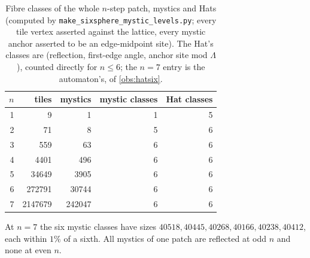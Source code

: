 \documentclass[11pt,a4paper]{article}
\newcommand{\Lam}{\Lambda}
\theoremstyle{plain}
\theoremstyle{definition}
\begin{document}
\begin{table}[htbp]
\centering
\begin{tabular}{rrrrr}
\toprule
$n$ & tiles & mystics & mystic classes & Hat classes\\
\midrule
1 & 9       & 1       & 1 & 5\\
2 & 71      & 8       & 5 & 6\\
3 & 559     & 63      & 6 & 6\\
4 & 4401    & 496     & 6 & 6\\
5 & 34649   & 3905    & 6 & 6\\
6 & 272791  & 30744   & 6 & 6\\
7 & 2147679 & 242047  & 6 & 6\\
\bottomrule
\end{tabular}
\caption{Fibre classes of the whole $n$-step patch, mystics and Hats (computed by
\texttt{make\_sixsphere\_mystic\_levels.py}; every tile vertex asserted against the
lattice, every mystic anchor asserted to be an edge-midpoint site). The Hat's classes
are (reflection, first-edge angle, anchor site mod $\Lam$), counted directly for
$n\le6$; the $n=7$ entry is the automaton's, of \cref{obs:hatsix}.}
\label{tab:whole}
\end{table}

At $n=7$ the six mystic classes have sizes $40518, 40445, 40268, 40166, 40238, 40412$,
each within $1\%$ of a sixth. All mystics of one patch are reflected at odd $n$ and none
at even $n$.
\end{document}
